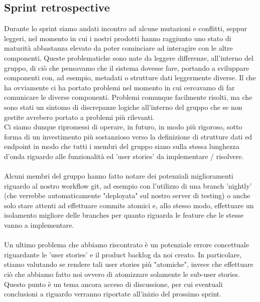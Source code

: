 \documentclass{article}
\begin{document}
\subsection{Sprint retrospective}
Durante lo sprint siamo andati incontro ad alcune mutazioni e conflitti, seppur leggeri, nel momento in cui i nostri prodotti hanno raggiunto uno stato di maturità abbastanza elevato da poter cominciare ad interagire con le altre componenti. 
Queste problematiche sono nate da leggere differenze, all'interno del gruppo, di ciò che pensavamo che il sistema dovesse fare, portando a sviluppare componenti con, ad esempio, metadati o strutture dati leggermente diverse. Il che ha ovviamente ci ha portato problemi nel momento in cui cercavamo di far comunicare le diverse componenti. Problemi comunque facilmente risolti, ma che sono stati un sintomo di discrepanze logiche all'interno del gruppo che se non gestite avrebero portato a problemi più rilevanti.\\
Ci siamo dunque ripromessi di operare, in futuro, in modo più rigoroso, sotto forma di un investimento più sostanzioso verso la definizione di strutture dati ed endpoint in modo che tutti i membri del gruppo siano sulla stessa lunghezza d'onda riguardo alle funzionalità ed 'user stories' da implementare / risolvere. \\
\\
Alcuni membri del gruppo hanno fatto notare dei potenziali miglioramenti riguardo al nostro workflow git, ad esempio con l'utilizzo di una branch 'nightly' (che verrebbe automaticamente "deployata" sul nostro server di testing) o anche solo stare attenti ad effettuare commits atomici e, allo stesso modo, effettuare un isolamento migliore delle branches per quanto riguarda le feature che le stesse vanno a implementare. \\
\\
Un ultimo problema che abbiamo riscontrato è un potenziale errore concettuale riguardante le 'user stories' e il product backlog da noi creato. In particolare, stiamo valutando se rendere tali user stories più "atomiche", invece che effettuare ciò che abbiamo fatto noi ovvero di atomizzare solamente le sub-user stories. \\
Questo punto è un tema ancora acceso di discussione, per cui eventuali conclusioni a riguardo verranno riportate all'inizio del prossimo sprint.
\end{document}
